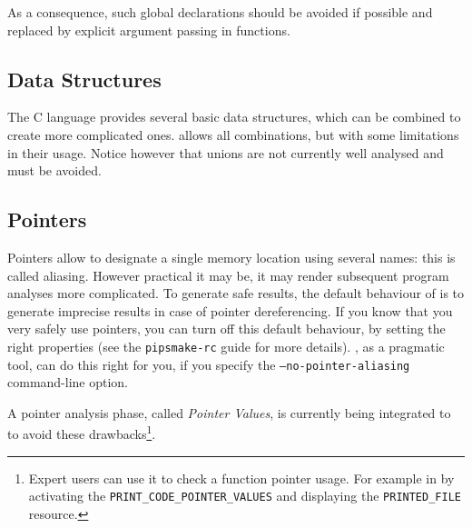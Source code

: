 \documentclass[a4paper]{article}
\begin{document}
As a consequence, such global declarations should be avoided if
possible and replaced by explicit argument passing in functions.



\subsection{Data Structures}
\label{sec:data_structures}

The C language provides several basic data structures, which can be
combined to create more complicated ones. \Apips allows all
combinations, but with some limitations in their usage. Notice however
that unions are not currently well analysed and must be avoided.


\subsection{Pointers}
\label{sec:pointers}

Pointers allow to designate a single memory location using several
names: this is called aliasing. However practical it may be, it may
render subsequent program analyses more complicated. To generate safe
results, the default behaviour of \Apips is to generate imprecise
results in case of pointer dereferencing. If you know that you very
safely use pointers, you can turn off this default behaviour, by
setting the right properties (see the \texttt{pipsmake-rc} guide for
more details). \Apfa, as a pragmatic tool, can do this right for you,
if you specify the \texttt{--no-pointer-aliasing} command-line option.

A pointer analysis phase, called \emph{Pointer Values}, is currently being
integrated to \Apips to avoid these drawbacks\footnote{Expert users can
  use it to check a function pointer usage. For example in \Apips by
  activating the \texttt{PRINT\_CODE\_POINTER\_VALUES} and displaying the
  \texttt{PRINTED\_FILE} resource.}.
\end{document}
